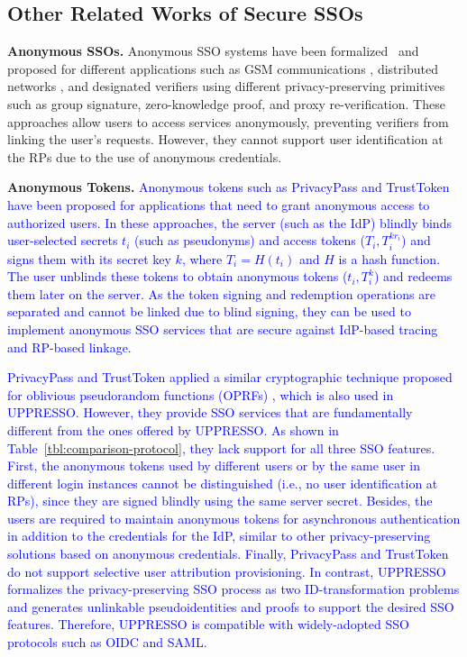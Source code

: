 \subsection{Other Related Works of Secure SSOs}
\label{sec:related}

\noindent\textbf{Anonymous SSOs.} Anonymous SSO systems have been formalized~\cite{WangWS13} and proposed for different applications such as GSM communications \cite{ElmuftiWRR08}, distributed networks \cite{WangWS13}, and designated verifiers \cite{HanCSTW18, HanCSTWW20} using different privacy-preserving primitives such as group signature, zero-knowledge proof, and proxy re-verification. These approaches allow users to access services anonymously, preventing verifiers from linking the user's requests. However, they cannot support user identification at the RPs due to the use of anonymous credentials.

%
\noindent\textbf{Anonymous Tokens.}
\textcolor{blue}{Anonymous tokens such as PrivacyPass and TrustToken \cite{privacypass, trusttoken} have been proposed for applications that need to grant anonymous access to authorized users. In these approaches, the server (such as the IdP) blindly binds user-selected secrets $t_i$ (such as pseudonyms) and access tokens ($T_i, T_i^{k{r_i}}$) and signs them with its secret key $k$, where $T_i=H(t_i)$ and $H$ is a hash function. The user unblinds these tokens to obtain anonymous tokens ($t_i, T_i^k$) and redeems them later on the server. As the token signing and redemption operations are separated and cannot be linked due to blind signing, they can be used to implement anonymous SSO services that are secure against IdP-based tracing and RP-based linkage.
}

\textcolor{blue}{PrivacyPass and TrustToken applied a similar cryptographic technique proposed for oblivious pseudorandom functions (OPRFs) \cite{oprf-proved}, which is also used in UPPRESSO. However, they provide SSO services that are fundamentally different from the ones offered by UPPRESSO. As shown in Table~\ref{tbl:comparison-protocol}, they lack support for all three SSO features. First, the anonymous tokens used by different users or by the same user in different login instances cannot be distinguished (i.e., no user identification at RPs), since they are signed blindly using the same server secret. Besides, the users are required to maintain anonymous tokens for asynchronous authentication in addition to the credentials for the IdP, similar to other privacy-preserving solutions based on anonymous credentials. Finally, PrivacyPass and TrustToken do not support selective user attribution provisioning. In contrast, UPPRESSO formalizes the privacy-preserving SSO process as two ID-transformation problems and generates unlinkable pseudoidentities and proofs to support the desired SSO features. Therefore,  UPPRESSO is  compatible with widely-adopted SSO protocols such as OIDC and SAML.
}

